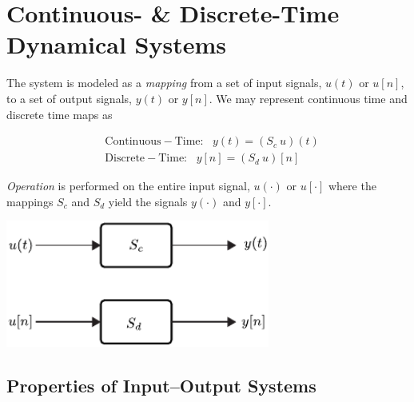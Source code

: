 \documentclass[12pt,oneside]{amsart}
\begin{document}
\newpage

\section{Continuous- \& Discrete-Time Dynamical Systems} 

The system is modeled as a \textit{mapping} from a set of input
signals, $u(t)$ or $u[n]$, to a set of output signals, $y(t)$ or $y[n]$.
We may represent continuous time and discrete time maps as

\begin{align*}
  &\mathrm{Continuous-Time}: \ \ \ y(t) = (S_c \ u) (t) \\
  &\mathrm{Discrete-Time}: \ \ \ y[n] = (S_d \ u) [n] 
\end{align*}

\vspace{6pt}

\textit{Operation} is performed on the entire input signal, $u(\cdot)$ or
$u[\cdot]$ where the mappings $S_c$ and $S_d$ yield the signals
$y(\cdot)$ and $y[\cdot]$. 

\vspace{12pt}

    \begin{center}
  \begin{minipage}[h]{0.9\linewidth}
    \begin{center}
      \includegraphics[width=0.65\textwidth]{blocks}
    \end{center}
  \end{minipage}
    \end{center}

\vspace{12pt}

\subsection{Properties of Input--Output Systems}
\end{document}
